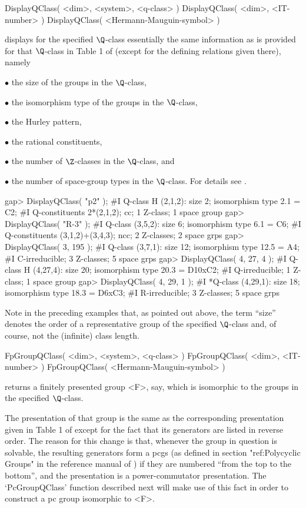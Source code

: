 \>DisplayQClass( <dim>, <system>, <q-class> )
\>DisplayQClass( <dim>, <IT-number> )
\>DisplayQClass( <Hermann-Mauguin-symbol> )

displays for the specified $\Q$-class essentially the same information
as is provided for that $\Q$-class in Table 1 of \cite{BBNWZ78}
(except for the defining relations given there), namely
\beginlist%
\item{$\bullet$} the size of the groups in the $\Q$-class,
\item{$\bullet$} the isomorphism type of the groups in the $\Q$-class,
\item{$\bullet$} the Hurley pattern,
\item{$\bullet$} the rational constituents,
\item{$\bullet$} the number of $\Z$-classes in the $\Q$-class, and
\item{$\bullet$} the number of space-group types in the $\Q$-class.
\endlist
For details see \cite{BBNWZ78}.

\beginexample
gap> DisplayQClass( "p2" );
#I   Q-class H (2,1,2): size 2; isomorphism type 2.1 = C2;
#I    Q-constituents 2*(2,1,2); cc; 1 Z-class; 1 space group
gap> DisplayQClass( "R-3" );
#I   Q-class (3,5,2): size 6; isomorphism type 6.1 = C6;
#I    Q-constituents (3,1,2)+(3,4,3); ncc; 2 Z-classes; 2 space grps
gap> DisplayQClass( 3, 195 );
#I   Q-class (3,7,1): size 12; isomorphism type 12.5 = A4;
#I    C-irreducible; 3 Z-classes; 5 space grps
gap> DisplayQClass( 4, 27, 4 );
#I   Q-class H (4,27,4): size 20; isomorphism type 20.3 = D10xC2;
#I    Q-irreducible; 1 Z-class; 1 space group
gap> DisplayQClass( 4, 29, 1 );
#I  *Q-class (4,29,1): size 18; isomorphism type 18.3 = D6xC3;
#I    R-irreducible; 3 Z-classes; 5 space grps
\endexample

Note in the preceding examples that, as pointed out above, the term
``size'' denotes the order of a representative group of the specified
$\Q$-class and, of course, not the (infinite) class length.

\>FpGroupQClass( <dim>, <system>, <q-class> )
\>FpGroupQClass( <dim>, <IT-number> )
\>FpGroupQClass( <Hermann-Mauguin-symbol> )

returns a finitely presented group <F>, say, which is isomorphic to
the groups in the specified $\Q$-class.

The presentation of that group is the same as the corresponding
presentation given in Table 1 of \cite{BBNWZ78} except for the fact
that its generators are listed in reverse order.  The reason for this
change is that, whenever the group in question is solvable, the
resulting generators form a pcgs (as defined in section "ref:Polycyclic
Groups" in the reference manual of {\GAP}) if they are numbered 
``from the top to the bottom'', and the presentation is a 
power-commutator presentation.  The `PcGroupQClass' function described 
next will make use of this fact in order to construct a pc group 
isomorphic to <F>.

